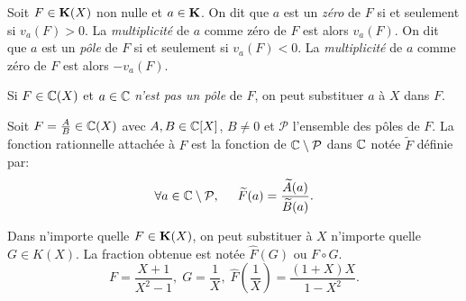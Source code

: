  
\begin{defi}
Soit $F \in \mathbf{K}(X)$ non nulle et $a\in \mathbf{K}$.\newline
On dit que $a$ est un \emph{zéro} de $F$ si et seulement si $v_a(F) > 0$. La \emph{multiplicité} de $a$ comme zéro de $F$ est alors $v_a(F)$.\newline
On dit que $a$ est un \emph{pôle} de $F$ si et seulement si $v_a(F) < 0$. La \emph{multiplicité} de $a$ comme zéro de $F$ est alors $-v_a(F)$. 
\end{defi}

Si $F \in \mathbb{C}(X)$ et $a \in \mathbb{C}$ \emph{n'est pas un pôle} de $F$, on peut substituer $a$ à $X$ dans $F$.
\begin{defi}
Soit $F = \frac{A}{B}\in \mathbb{C}(X)$ avec $A, B \in \mathbb{C}[X]$, $B\neq 0$ et $\mathcal{P}$ l'ensemble des pôles de $F$. La fonction rationnelle attachée à $F$ est la fonction de $\mathbb{C} \setminus \mathcal{P}$ dans $\mathbb{C}$ notée $\widetilde{F}$ définie par:
\[
 \forall a \in \mathbb{C} \setminus \mathcal{P}, \hspace{0.5cm} \widetilde{F}(a) = \frac{\widetilde{A}(a)}{\widetilde{B}(a)}.
\]
\end{defi}
\begin{rem}
  Dans n'importe quelle $F\in \mathbf{K}(X)$, on peut substituer à $X$ n'importe quelle $G\in K(X)$. La fraction obtenue est notée $\widehat{F}(G)$ ou $F \circ G$.
\[
  F = \frac{X + 1}{X^2 - 1},\; G = \frac{1}{X},\; \widehat{F}(\frac{1}{X}) = \frac{(1 + X)X}{1-X^2} .
\]
\end{rem}

